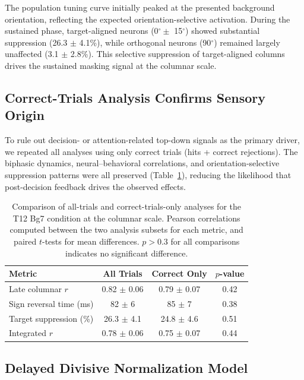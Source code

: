 \documentclass[11pt]{article}
\begin{document}
The population tuning curve initially peaked at the presented background orientation, reflecting the expected orientation-selective activation. During the sustained phase, target-aligned neurons (0$^\circ \pm$ 15$^\circ$) showed substantial suppression (26.3 $\pm$ 4.1\%), while orthogonal neurons (90$^\circ$) remained largely unaffected (3.1 $\pm$ 2.8\%). This selective suppression of target-aligned columns drives the sustained masking signal at the columnar scale.

\subsection{Correct-Trials Analysis Confirms Sensory Origin}

To rule out decision- or attention-related top-down signals as the primary driver, we repeated all analyses using only correct trials (hits + correct rejections). The biphasic dynamics, neural--behavioral correlations, and orientation-selective suppression patterns were all preserved (Table~\ref{tab:correct_trials}), reducing the likelihood that post-decision feedback drives the observed effects.

\begin{table}[H]
\centering
\caption{Comparison of all-trials and correct-trials-only analyses for the T12 Bg7 condition at the columnar scale. Pearson correlations computed between the two analysis subsets for each metric, and paired $t$-tests for mean differences. $p > 0.3$ for all comparisons indicates no significant difference.}
\label{tab:correct_trials}
\begin{tabular}{lccc}
\toprule
\textbf{Metric} & \textbf{All Trials} & \textbf{Correct Only} & \textbf{$p$-value} \\
\midrule
Late columnar $r$ & 0.82 $\pm$ 0.06 & 0.79 $\pm$ 0.07 & 0.42 \\
Sign reversal time (ms) & 82 $\pm$ 6 & 85 $\pm$ 7 & 0.38 \\
Target suppression (\%) & 26.3 $\pm$ 4.1 & 24.8 $\pm$ 4.6 & 0.51 \\
Integrated $r$ & 0.78 $\pm$ 0.06 & 0.75 $\pm$ 0.07 & 0.44 \\
\bottomrule
\end{tabular}
\end{table}

\subsection{Delayed Divisive Normalization Model}
\end{document}
